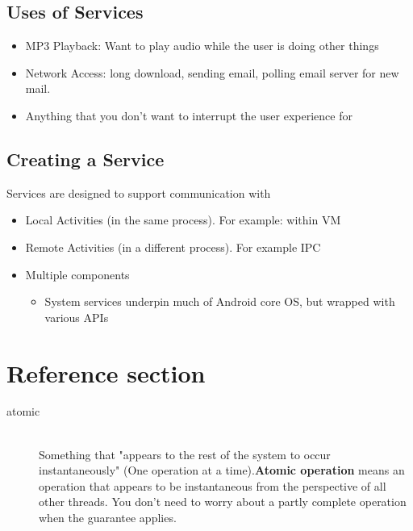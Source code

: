 \documentclass{article}
\begin{document}
\subsection{Uses of Services}
\begin{itemize}
  \item MP3	Playback: Want to play audio while the user is doing other things
  \item Network Access: long download, sending email, polling email server for new mail.
  \item Anything	that	you	don’t	want	to	interrupt	the	user	experience	for
\end{itemize}

\subsection{Creating a Service}
Services	are	designed	to	support	communication	with
\begin{itemize}
  \item Local	Activities	(in	the	same	process). For example: within	VM
  \item Remote	Activities	(in	a	different	process). For example IPC
  \item Multiple	components
  \begin{itemize}
    \item System services	underpin	much	of	Android	core	OS,	but	wrapped	with	various	APIs
  \end{itemize}
\end{itemize}

\newpage

\section*{Reference section} \label{sec:reference}
\begin{description}
	\item[atomic] \hfill \\ Something that "appears to the rest of the system to occur instantaneously" (One operation at a time).\textbf{Atomic operation} means an operation that appears to be instantaneous from the perspective of all other threads. You don't need to worry about a partly complete operation when the guarantee applies.
\end{description}
\end{document}
